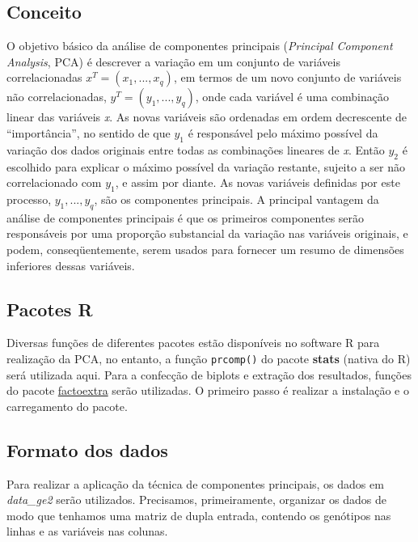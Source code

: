 \documentclass[
]{book}
\begin{document}
\hypertarget{conceito}{%
\subsection{Conceito}\label{conceito}}

O objetivo básico da análise de componentes principais (\emph{Principal Component Analysis}, PCA) é descrever a variação em um conjunto de variáveis correlacionadas \(x^T = (x_1, ..., x_q)\), em termos de um novo conjunto de variáveis não correlacionadas, \(y^T = (y_1, ..., y_q)\), onde cada variável é uma combinação linear das variáveis \emph{x}. As novas variáveis são ordenadas em ordem decrescente de ``importância'', no sentido de que \(y_1\) é responsável pelo máximo possível da variação dos dados originais entre todas as combinações lineares de \emph{x}. Então \(y_2\) é escolhido para explicar o máximo possível da variação restante, sujeito a ser não correlacionado com \(y_1\), e assim por diante. As novas variáveis definidas por este processo, \(y_1, ..., y_q\), são os componentes principais. A principal vantagem da análise de componentes principais é que os primeiros componentes serão responsáveis por uma proporção substancial da variação nas variáveis originais, e podem, conseqüentemente, serem usados para fornecer um resumo de dimensões inferiores dessas variáveis.

\hypertarget{pacotes-r}{%
\subsection{Pacotes R}\label{pacotes-r}}

Diversas funções de diferentes pacotes estão disponíveis no software R para realização da PCA, no entanto, a função \texttt{prcomp()} do pacote \textbf{stats} (nativa do R) será utilizada aqui. Para a confecção de biplots e extração dos resultados, funções do pacote \href{https://rpkgs.datanovia.com/factoextra/index.html}{factoextra} serão utilizadas. O primeiro passo é realizar a instalação e o carregamento do pacote.

\hypertarget{formato-dos-dados}{%
\subsection{Formato dos dados}\label{formato-dos-dados}}

Para realizar a aplicação da técnica de componentes principais, os dados em \emph{data\_ge2} serão utilizados. Precisamos, primeiramente, organizar os dados de modo que tenhamos uma matriz de dupla entrada, contendo os genótipos nas linhas e as variáveis nas colunas.
\end{document}
